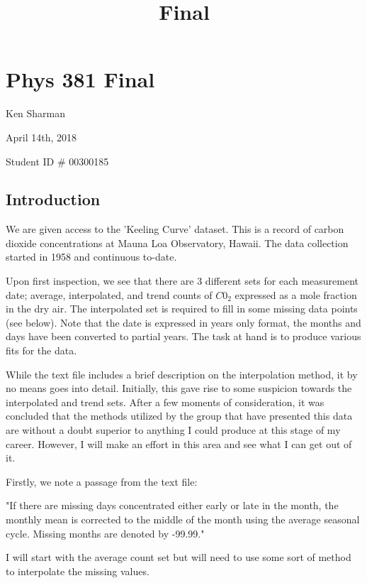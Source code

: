 \documentclass[11pt]{article}
\title{Final}
\begin{document}
    
    
    \maketitle
    
    

    
    \section{Phys 381 Final}\label{phys-381-final}

Ken Sharman

April 14th, 2018

Student ID \# 00300185

    \subsection{Introduction}\label{introduction}

We are given access to the 'Keeling Curve' dataset. This is a record of
carbon dioxide concentrations at Mauna Loa Observatory, Hawaii. The data
collection started in 1958 and continuous to-date.

Upon first inspection, we see that there are 3 different sets for each
measurement date; average, interpolated, and trend counts of \(C0_2\)
expressed as a mole fraction in the dry air. The interpolated set is
required to fill in some missing data points (see below). Note that the
date is expressed in years only format, the months and days have been
converted to partial years. The task at hand is to produce various fits
for the data.

While the text file includes a brief description on the interpolation
method, it by no means goes into detail. Initially, this gave rise to
some suspicion towards the interpolated and trend sets. After a few
moments of consideration, it was concluded that the methods utilized by
the group that have presented this data are without a doubt superior to
anything I could produce at this stage of my career. However, I will
make an effort in this area and see what I can get out of it.

Firstly, we note a passage from the text file:

"If there are missing days concentrated either early or late in the
month, the monthly mean is corrected to the middle of the month using
the average seasonal cycle. Missing months are denoted by -99.99."

I will start with the average count set but will need to use some sort
of method to interpolate the missing values.
\end{document}
